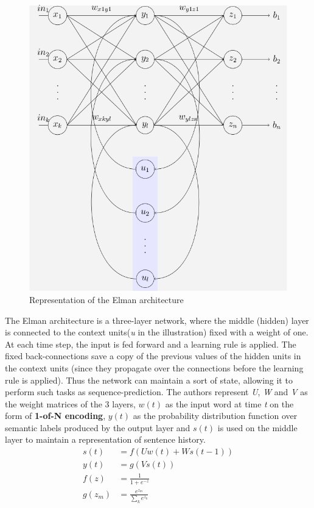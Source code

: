 \documentclass{scrartcl}
\begin{document}
    \begin{figure}[h!]
        \centering
        \includegraphics[scale=0.3]{elman.png}
        \caption{Representation of the Elman architecture}
    \end{figure} 
    The Elman architecture is a three-layer network, where the middle (hidden) layer is connected 
    to the context units(\textit{u} in the illustration) fixed with a weight of one. 
    At each time step, the input is fed forward and a learning rule is applied. 
    The fixed back-connections save a copy of the previous values of the hidden units in the 
    context units (since they propagate over the connections before the learning rule is applied). 
    Thus the network can maintain a sort of state, allowing it to perform such tasks as 
    sequence-prediction.
    The authors represent \textit{U}, \textit{W} and \textit{V} as the weight matrices of 
    the 3 layers, $w(t)$ as the input word at time \textit{t} on the form of \textbf{1-of-N encoding},
    $y(t)$ as the probability distribution function over semantic labels
    produced by the output layer and  $s(t)$ is used on the middle layer to maintain
    a representation of sentence history.
    \begin{align*}
        s(t) &= f(Uw(t) + Ws(t-1)) \\
        y(t) &= g(Vs(t)) \\
        f(z) &= \frac{1}{1 + e^{-z}} \\
        g(z_m) &= \frac{e^{z_m}}{\sum_k e^{z_k}}
    \end{align*} 
\end{document}
